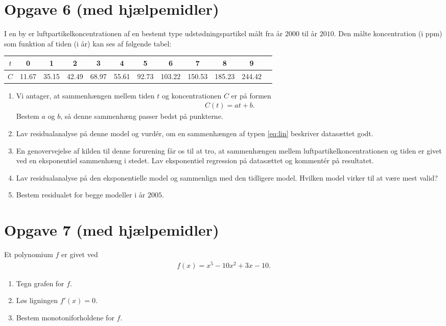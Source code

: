 \documentclass[12pt]{article}
\begin{document}
\section*{Opgave 6 (med hjælpemidler)}


I en by er luftpartikelkoncentrationen af en bestemt type udstødningspartikel målt fra år $2000$ til år $2010$. Den målte koncentration (i ppm) som funktion af tiden (i år) kan ses af følgende tabel:
\begin{center}
\begin{tabular}{c|c|c|c|c|c|c|c|c|c|c|c}
$t$  & 0 & 1 & 2 & 3 & 4 & 5 & 6 & 7 & 8 & 9  \\
\hline
$C$  &11.67 & 35.15 & 42.49 & 68.97 & 55.61 & 92.73 & 103.22 & 150.53 & 185.23 & 244.42
\end{tabular}
\end{center}

\begin{enumerate}[label=\roman*)]
\item Vi antager, at sammenhængen mellem tiden $t$ og koncentrationen $C$ er på formen
\begin{align}\label{eq:lin}
C(t) = at+b.
\end{align}
Bestem $a$ og $b$, så denne sammenhæng passer bedst på punkterne. 
\item Lav residualanalyse på denne model og vurdér, om en sammenhængen af typen \eqref{eq:lin} beskriver datasættet godt.
\item En genovervejelse af kilden til denne forurening får os til at tro, at sammenhængen mellem luftpartikelkoncentrationen og tiden er givet ved en eksponentiel sammenhæng i stedet. Lav eksponentiel regression på datasættet og kommentér på resultatet.
\item Lav residualanalyse på den eksponentielle model og sammenlign med den tidligere model. Hvilken model virker til at være mest valid?
\item Bestem residualet for begge modeller i år $2005$.
\end{enumerate}

\section*{Opgave 7 (med hjælpemidler)}

Et polynomium $f$ er givet ved
\begin{align*}
f(x) = x^5-10x^2+3x-10.
\end{align*}
\begin{enumerate}[label=\roman*)]
\item Tegn grafen for $f$. 
\item Løs ligningen $f'(x) = 0$.
\item Bestem monotoniforholdene for $f$. 
\end{enumerate}
\end{document}
